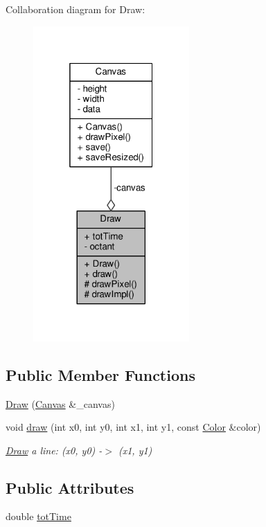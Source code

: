 Collaboration diagram for Draw\+:
\nopagebreak
\begin{figure}[H]
\begin{center}
\leavevmode
\includegraphics[width=169pt]{classDraw__coll__graph}
\end{center}
\end{figure}
\subsection*{Public Member Functions}
\begin{DoxyCompactItemize}
\item 
\hyperlink{classDraw_ab01ae8a362d3c42015e7c1634109fc7b}{Draw} (\hyperlink{classCanvas}{Canvas} \&\+\_\+canvas)
\item 
void \hyperlink{classDraw_a4948f44fd8928e53243deb5348567bb0}{draw} (int x0, int y0, int x1, int y1, const \hyperlink{canvas_8h_a084a39206618848fb8bc9187d3758c87}{Color} \&color)
\begin{DoxyCompactList}\small\item\em \hyperlink{classDraw}{Draw} a line\+: (x0, y0) -\/$>$ (x1, y1) \end{DoxyCompactList}\end{DoxyCompactItemize}
\subsection*{Public Attributes}
\begin{DoxyCompactItemize}
\item 
double \hyperlink{classDraw_aca821acc8a6745c5ef690ab84f65be7f}{tot\+Time}
\end{DoxyCompactItemize}
